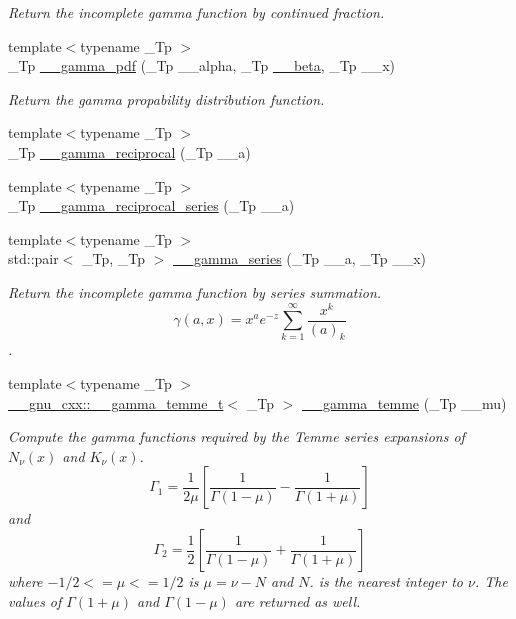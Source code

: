 \begin{DoxyCompactItemize}
\begin{DoxyCompactList}\small\item\em Return the incomplete gamma function by continued fraction. \end{DoxyCompactList}\item 
{\footnotesize template$<$typename \+\_\+\+Tp $>$ }\\\+\_\+\+Tp \hyperlink{namespacestd_1_1____detail_a13146321e4e094815de990c33b83b02a}{\+\_\+\+\_\+gamma\+\_\+pdf} (\+\_\+\+Tp \+\_\+\+\_\+alpha, \+\_\+\+Tp \hyperlink{namespacestd_1_1____detail_a090d2f0920e0d208c467609b2a81d717}{\+\_\+\+\_\+beta}, \+\_\+\+Tp \+\_\+\+\_\+x)
\begin{DoxyCompactList}\small\item\em Return the gamma propability distribution function. \end{DoxyCompactList}\item 
{\footnotesize template$<$typename \+\_\+\+Tp $>$ }\\\+\_\+\+Tp \hyperlink{namespacestd_1_1____detail_a8ac187fda39e0c55614e4c58146f871c}{\+\_\+\+\_\+gamma\+\_\+reciprocal} (\+\_\+\+Tp \+\_\+\+\_\+a)
\item 
{\footnotesize template$<$typename \+\_\+\+Tp $>$ }\\\+\_\+\+Tp \hyperlink{namespacestd_1_1____detail_a08dc6d850e2f02ff45deaa4772298cf3}{\+\_\+\+\_\+gamma\+\_\+reciprocal\+\_\+series} (\+\_\+\+Tp \+\_\+\+\_\+a)
\item 
{\footnotesize template$<$typename \+\_\+\+Tp $>$ }\\std\+::pair$<$ \+\_\+\+Tp, \+\_\+\+Tp $>$ \hyperlink{namespacestd_1_1____detail_aa480c595e1c5b894d76398cf0e8eb02b}{\+\_\+\+\_\+gamma\+\_\+series} (\+\_\+\+Tp \+\_\+\+\_\+a, \+\_\+\+Tp \+\_\+\+\_\+x)
\begin{DoxyCompactList}\small\item\em Return the incomplete gamma function by series summation. \[ \gamma(a,x) = x^a e^{-z}\sum_{k=1}^{\infty} \frac{x^k}{(a)_k} \]. \end{DoxyCompactList}\item 
{\footnotesize template$<$typename \+\_\+\+Tp $>$ }\\\hyperlink{struct____gnu__cxx_1_1____gamma__temme__t}{\+\_\+\+\_\+gnu\+\_\+cxx\+::\+\_\+\+\_\+gamma\+\_\+temme\+\_\+t}$<$ \+\_\+\+Tp $>$ \hyperlink{namespacestd_1_1____detail_a0d4fa90f527fd05d057b27ba0366488a}{\+\_\+\+\_\+gamma\+\_\+temme} (\+\_\+\+Tp \+\_\+\+\_\+mu)
\begin{DoxyCompactList}\small\item\em Compute the gamma functions required by the Temme series expansions of $ N_\nu(x) $ and $ K_\nu(x) $. \[ \Gamma_1 = \frac{1}{2\mu} \left[\frac{1}{\Gamma(1 - \mu)} - \frac{1}{\Gamma(1 + \mu)}\right] \] and \[ \Gamma_2 = \frac{1}{2} \left[\frac{1}{\Gamma(1 - \mu)} + \frac{1}{\Gamma(1 + \mu)}\right] \] where $ -1/2 <= \mu <= 1/2 $ is $ \mu = \nu - N $ and $ N $. is the nearest integer to $ \nu $. The values of $ \Gamma(1 + \mu) $ and $ \Gamma(1 - \mu) $ are returned as well. \end{DoxyCompactList}\item 

\end{DoxyCompactItemize}
